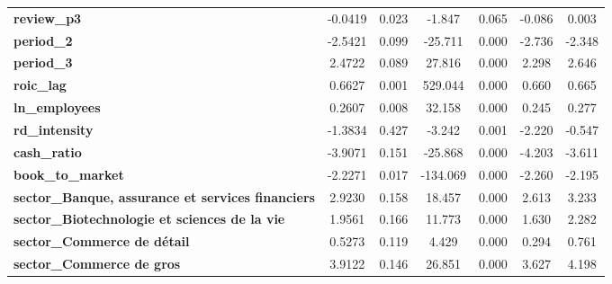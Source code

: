 \begin{center}
\begin{tabular}{lcccccc}
\textbf{review\_p3}                                                   &      -0.0419  &        0.023     &    -1.847  &         0.065        &       -0.086    &        0.003     \\
\textbf{period\_2}                                                    &      -2.5421  &        0.099     &   -25.711  &         0.000        &       -2.736    &       -2.348     \\
\textbf{period\_3}                                                    &       2.4722  &        0.089     &    27.816  &         0.000        &        2.298    &        2.646     \\
\textbf{roic\_lag}                                                    &       0.6627  &        0.001     &   529.044  &         0.000        &        0.660    &        0.665     \\
\textbf{ln\_employees}                                                &       0.2607  &        0.008     &    32.158  &         0.000        &        0.245    &        0.277     \\
\textbf{rd\_intensity}                                                &      -1.3834  &        0.427     &    -3.242  &         0.001        &       -2.220    &       -0.547     \\
\textbf{cash\_ratio}                                                  &      -3.9071  &        0.151     &   -25.868  &         0.000        &       -4.203    &       -3.611     \\
\textbf{book\_to\_market}                                             &      -2.2271  &        0.017     &  -134.069  &         0.000        &       -2.260    &       -2.195     \\
\textbf{sector\_Banque, assurance et services financiers}             &       2.9230  &        0.158     &    18.457  &         0.000        &        2.613    &        3.233     \\
\textbf{sector\_Biotechnologie et sciences de la vie}                 &       1.9561  &        0.166     &    11.773  &         0.000        &        1.630    &        2.282     \\
\textbf{sector\_Commerce de détail}                                   &       0.5273  &        0.119     &     4.429  &         0.000        &        0.294    &        0.761     \\
\textbf{sector\_Commerce de gros}                                     &       3.9122  &        0.146     &    26.851  &         0.000        &        3.627    &        4.198     \\

\end{tabular}
\end{center}
